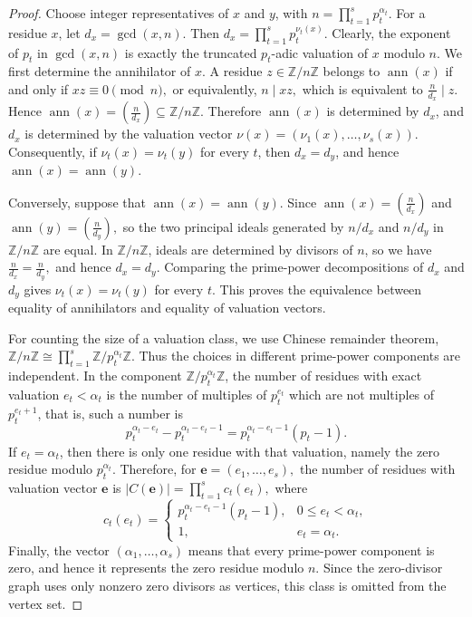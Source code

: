 \documentclass[10pt,a4paper]{amsart}
\begin{document}
\begin{proof}
	Choose integer representatives of $x$ and $y$, with 
	$ n=\prod_{t=1}^{s}p_t^{\alpha_t}. $
	For a residue $x$, let
	$ d_x=\gcd(x,n). $
	Then
	$ d_x=\prod_{t=1}^{s}p_t^{\nu_t(x)}. $
	Clearly, the exponent of $p_t$ in $\gcd(x,n)$ is exactly the truncated
	$p_t$-adic valuation of $x$ modulo $n$. We first determine the annihilator of $x$.  A residue $z\in \mathbb{Z}/n\mathbb{Z}$ belongs
	to $\operatorname{ann}(x)$ if and only if
	 $xz\equiv 0 \pmod n, $
	or equivalently,
	$ n\mid xz,$  which is equivalent to
	$ \frac{n}{d_x}\mid z. $
	Hence
	$ \operatorname{ann}(x)=\left(\frac{n}{d_x}\right)
	\subseteq \mathbb{Z}/n\mathbb{Z}. $
	Therefore $\operatorname{ann}(x)$ is determined by $d_x$, and $d_x$ is determined by the
	valuation vector
	$ \nu(x)=(\nu_1(x),\ldots,\nu_s(x)). $
	Consequently, if $\nu_t(x)=\nu_t(y)$ for every $t$, then $d_x=d_y$, and hence
	$\operatorname{ann}(x)=\operatorname{ann}(y)$.
	
	 Conversely, suppose that $\operatorname{ann}(x)=\operatorname{ann}(y)$.  Since
	$ \operatorname{ann}(x)=\left(\frac{n}{d_x}\right)$ and $ \operatorname{ann}(y)=\left(\frac{n}{d_y}\right), $ so
	the two principal ideals generated by $n/d_x$ and $n/d_y$ in $\mathbb{Z}/n\mathbb{Z}$ are
	equal.  In $\mathbb{Z}/n\mathbb{Z}$, ideals are determined by divisors of $n$, so we have 
	$ \frac{n}{d_x}=\frac{n}{d_y}, $
	and hence $d_x=d_y$.  Comparing the prime-power decompositions of $d_x$ and
	$d_y$ gives
	$ \nu_t(x)=\nu_t(y) $ for every $t. $
	This proves the equivalence between equality of annihilators and equality of
	valuation vectors.
	
	 For counting the size of a valuation class, we use Chinese remainder theorem,
	$ \mathbb{Z}/n\mathbb{Z}\cong \prod_{t=1}^{s}\mathbb{Z}/p_t^{\alpha_t}\mathbb{Z}.$
	Thus the choices in different prime-power components are independent.  In the
	component $\mathbb{Z}/p_t^{\alpha_t}\mathbb{Z}$, the number of residues with exact
	valuation $e_t<\alpha_t$ is the number of multiples of $p_t^{e_t}$ which are
	not multiples of $p_t^{e_t+1}$, that is, such a number is
	$$
	p_t^{\alpha_t-e_t}-p_t^{\alpha_t-e_t-1}
	=
	p_t^{\alpha_t-e_t-1}(p_t-1).
	$$
	If $e_t=\alpha_t$, then there is only one residue with that valuation, namely
	the zero residue modulo $p_t^{\alpha_t}$. Therefore, for
	$ \mathbf e=(e_1,\ldots,e_s), $
	the number of residues with valuation vector $\mathbf e$ is
	$ |C(\mathbf e)|
	=
	\prod_{t=1}^{s}c_t(e_t), $
	where
	$$
	c_t(e_t)=
	\begin{cases}
		p_t^{\alpha_t-e_t-1}(p_t-1),&0\leq e_t<\alpha_t,\\
		1,&e_t=\alpha_t.
	\end{cases}
	$$
	Finally, the vector
	$ (\alpha_1,\ldots,\alpha_s) $
	means that every prime-power component is zero, and hence it represents the
	zero residue modulo $n$.  Since the zero-divisor graph uses only nonzero zero
	divisors as vertices, this class is omitted from the vertex set.
\end{proof}
\end{document}
